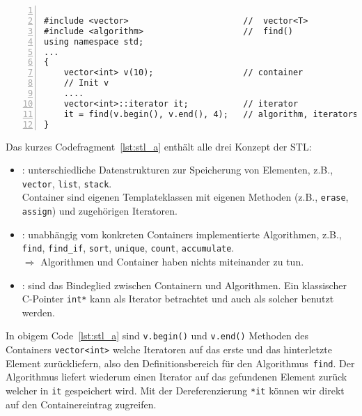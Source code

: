\begin{lstlisting}[caption={Intro STL},label=lst:stl_a,
basicstyle=\scriptsize,numbers=left, numberstyle=\tiny, stepnumber=2, numbersep=5pt]

#include <vector>                       //  vector<T>
#include <algorithm>                    //  find()
using namespace std;
...
{
    vector<int> v(10);                  // container
    // Init v
    ....
    vector<int>::iterator it;           // iterator
    it = find(v.begin(), v.end(), 4);   // algorithm, iterators
}
\end{lstlisting}
Das kurzes Codefragment~\ref{lst:stl_a} enthält alle drei Konzept der STL:
\begin{itemize}
    \item {}: unterschiedliche Datenstrukturen zur Speicherung von Elementen, z.B.,
      \verb|vector|, \verb|list|, \verb|stack|.
      \\
      Container sind eigenen Templateklassen mit eigenen Methoden (z.B., \verb|erase|, \verb|assign|)
      und zugehörigen Iteratoren.
    \item {}:
      unabhängig vom konkreten Containers implementierte Algorithmen, z.B.,
      \verb|find|, \verb|find_if|, \verb|sort|, \verb|unique|, \verb|count|, \verb|accumulate|.{}
      \\[0.5ex]
      $\Longrightarrow$ Algorithmen und Container haben nichts miteinander zu tun.
    \item {}:
       sind das Bindeglied zwischen Containern und Algorithmen.
       Ein klassischer C-Pointer \verb|int*| kann als Iterator betrachtet und auch als solcher benutzt werden.
\end{itemize}
In obigem Code~\ref{lst:stl_a} sind \verb|v.begin()| und \verb|v.end()| Methoden des Containers
\verb|vector<int>| welche Iteratoren auf das erste und das hinterletzte Element zurückliefern,
also den Definitionsbereich für den Algorithmus~\verb|find|.
Der Algorithmus liefert wiederum einen Iterator auf das gefundenen Element zurück welcher
in \verb|it| gespeichert wird. Mit der Dereferenzierung \verb|*it| können wir direkt auf
den Containereintrag zugreifen.



